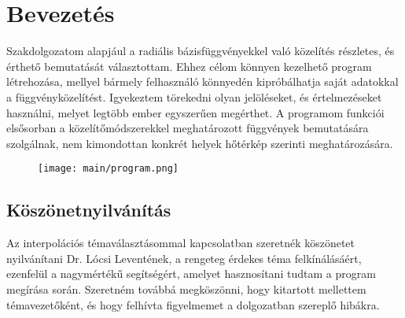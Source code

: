 	
\chapter{Bevezetés}	
 
	
	
		
				
		Szakdolgozatom alapjául a radiális bázisfüggvényekkel való közelítés részletes, és érthető bemutatását választottam. Ehhez célom könnyen kezelhető program létrehozása, mellyel bármely felhasználó könnyedén kipróbálhatja saját adatokkal a függvényközelítést. Igyekeztem törekedni olyan jelöléseket, és értelmezéseket használni, melyet legtöbb ember egyszerűen megérthet. A programom funkciói elsősorban a közelítőmódszerekkel meghatározott függvények bemutatására szolgálnak, nem kimondottan konkrét helyek hőtérkép szerinti meghatározására.
		
		\begin{figure}[ht]
			\centering
			\texttt{[image: main/program.png]}
		\end{figure} 
		
		\section*{Köszönetnyilvánítás}
		Az interpolációs témaválasztásommal kapcsolatban szeretnék köszönetet nyilvánítani Dr. Lócsi Leventének, a rengeteg érdekes téma felkínálásáért, ezenfelül a nagymértékű segítségért, amelyet hasznosítani tudtam a program megírása során. Szeretném továbbá megköszönni, hogy kitartott mellettem témavezetőként, és hogy felhívta figyelmemet a dolgozatban szereplő hibákra.
		
	
		
	
		
		